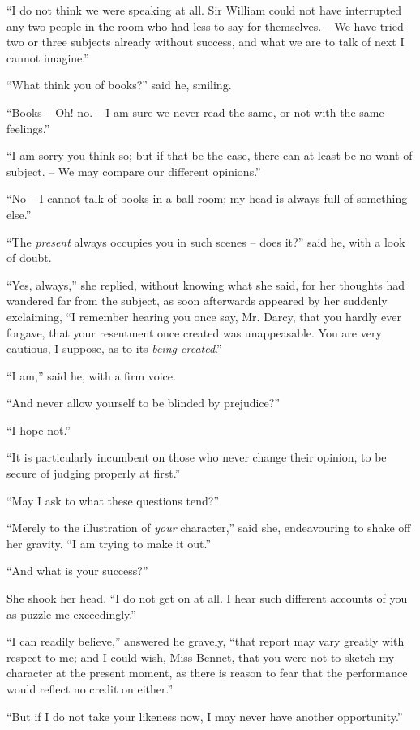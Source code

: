 “I do not think we were speaking at all. Sir William
could not have interrupted any two people in the room
who had less to say for themselves. -- We have tried two
or three subjects already without success, and what we
are to talk of next I cannot imagine.”

“What think you of books?” said he, smiling.

“Books -- Oh! no. -- I am sure we never read the same,
or not with the same feelings.”

“I am sorry you think so; but if that be the case,
there can at least be no want of subject. -- We may
compare our different opinions.”

“No -- I cannot talk of books in a ball-room; my head
is always full of something else.”

“The \textit{present} always occupies you in such scenes -- does
it?” said he, with a look of doubt.

“Yes, always,” she replied, without knowing what she
said, for her thoughts had wandered far from the subject,
as soon afterwards appeared by her suddenly exclaiming,
“I remember hearing you once say, Mr. Darcy, that you
hardly ever forgave, that your resentment once created
was unappeasable. You are very cautious, I suppose,
as to its \textit{being created}.”

“I am,” said he, with a firm voice.

“And never allow yourself to be blinded by prejudice?”

“I hope not.”

“It is particularly incumbent on those who never change
their opinion, to be secure of judging properly at first.”

“May I ask to what these questions tend?”

“Merely to the illustration of \textit{your} character,” said she,
endeavouring to shake off her gravity. “I am trying to
make it out.”

“And what is your success?”

She shook her head. “I do not get on at all. I hear
such different accounts of you as puzzle me exceedingly.”

“I can readily believe,” answered he gravely, “that
report may vary greatly with respect to me; and I could
wish, Miss Bennet, that you were not to sketch my
character at the present moment, as there is reason to
fear that the performance would reflect no credit on
either.”

“But if I do not take your likeness now, I may never
have another opportunity.”

